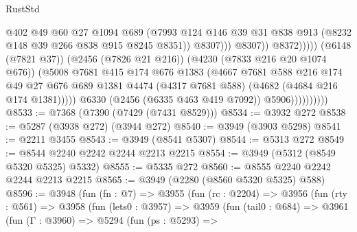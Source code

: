 \begin{lexlean}{RustStd}
\begin{coremodule}
                                              @402
                                              @49
                                              @60
                                              @27
                                              @1094
                                              @689
                                              (@7993
                                                @124
                                                @146
                                                @39
                                                @31
                                                @838
                                                @913
                                                (@8232 @148 @39 @266 @838 @915 @8245 @8351))
                                              @8307)))
                                        @8307))
                                    @8372)))))
                          (@6148 (@7821 @37))
                          (@2456 (@7826 @21 @216))
                          (@4230 (@7833 @216 @20 @1074 @676))
                          (@5008
                            @7681
                            @415
                            @174
                            @676
                            @1383
                            (@4667
                              @7681
                              @588
                              @216
                              @174
                              @49
                              @27
                              @676
                              @689
                              @1381
                              @4474
                              (@4317 @7681 @588)
                              (@4682 (@4684 @216 @174 @1381)))))
                        @6330
                        (@2456 (@6335 @463 @419 @7092))
                        @5906))))))))))
@8533 := @7368 (@7390 (@7429 (@7431 @8529)))
@8534 := @3932 @272
@8538 := @5287 (@3938 @272) (@3944 @272)
@8540 := @3949 (@3903 @5298)
@8541 := @2211 @3455
@8543 := @3949 (@8541 @5307)
@8544 := @5313 @272
@8549 := @8544 @2240 @2242 @2244 @2213 @2215
@8554 := @3949 (@5312 (@8549 @5320 @5325) @5332)
@8555 := @5335 @272
@8560 := @8555 @2240 @2242 @2244 @2213 @2215
@8565 := @3949 (@2280 (@8560 @5320 @5325) @588)
@8596 := @3948
    (fun (fn : @7) =>
    @3955
      (fun (rc : @2204) =>
      @3956
        (fun (rty : @561) =>
        @3958
          (fun (lets0 : @3957) =>
          @3959
            (fun (tail0 : @684) =>
            @3961
              (fun (Γ : @3960) =>
              @5294
                (fun (ps : @5293) =>

\end{coremodule}
\end{lexlean}
